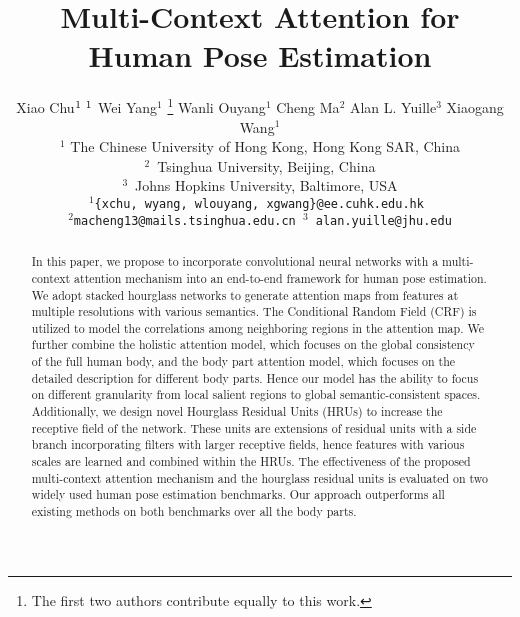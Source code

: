 \documentclass[10pt,twocolumn,letterpaper]{article}
\begin{document}
\title{Multi-Context Attention for Human Pose Estimation}
\author{
Xiao Chu$^{1}~\footnotemark[1]$ \quad Wei Yang$^{1}$
\thanks{ The first two authors contribute equally to this work.} \quad Wanli Ouyang$^{1}$ \quad Cheng Ma$^{2}$ \quad Alan L. Yuille$^{3}$ \quad Xiaogang Wang$^{1}$ \\
$^{1}$ The Chinese University of Hong Kong, Hong Kong SAR, China\\
$^{2}$~Tsinghua University, Beijing, China\\
$^{3}$~Johns Hopkins University, Baltimore, USA\\
$^{1}${\tt\small \{xchu, wyang, wlouyang, xgwang\}@ee.cuhk.edu.hk  } \\
$^{2}${\tt\small  macheng13@mails.tsinghua.edu.cn \quad $^{3}$ alan.yuille@jhu.edu}
}

\maketitle


\begin{abstract}
In this paper, we propose to incorporate convolutional neural networks with a multi-context attention mechanism into an end-to-end framework for human pose estimation. 
We adopt stacked hourglass networks to generate attention maps from features at multiple resolutions with various semantics. 
The Conditional Random Field (CRF) is utilized to model the correlations among neighboring regions in the attention map.
We further combine  the holistic attention model, which focuses on the global consistency of the full human body, and the body part attention model, which focuses on the detailed description for different body parts. Hence our model has the ability to focus on different granularity from local salient regions to global semantic-consistent spaces.
Additionally, we design novel Hourglass Residual Units (HRUs) to increase the receptive field of the network. These units are extensions of residual units with a side branch incorporating filters with larger receptive fields, hence features with various scales are learned and combined within the HRUs. 
The effectiveness of the proposed multi-context attention mechanism and the hourglass residual units is evaluated on two widely used human pose estimation benchmarks. Our approach outperforms all existing methods on both benchmarks over all the body parts. 
\end{abstract}
\end{document}
